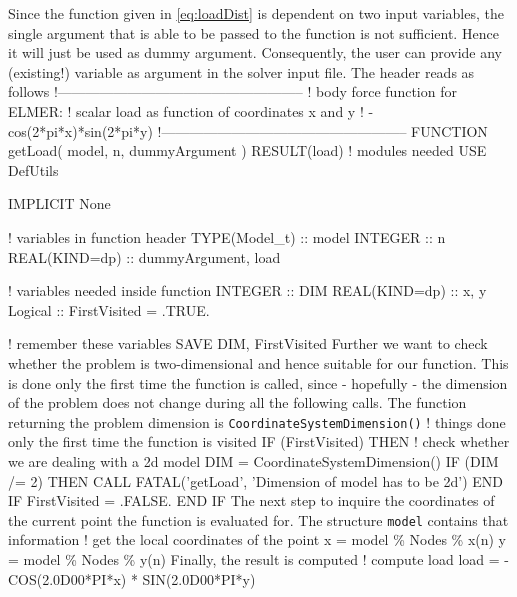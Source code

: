 Since the function given in \eqref{eq:loadDist} is dependent on two input variables, the single argument that is able to be passed to the function is not sufficient. Hence it will just be used as dummy argument. Consequently, the user can provide any (existing!) variable as argument in the solver input file. The header reads as follows
\ttbegin
!-----------------------------------------------------
! body force function for ELMER:
!   scalar load as function of coordinates x and y
!                -cos(2*pi*x)*sin(2*pi*y)  
!-----------------------------------------------------
FUNCTION getLoad( model, n, dummyArgument ) RESULT(load)
  ! modules needed
  USE DefUtils

  IMPLICIT None

  ! variables in function header
  TYPE(Model_t) :: model
  INTEGER :: n
  REAL(KIND=dp) :: dummyArgument, load

  ! variables needed inside function
  INTEGER :: DIM
  REAL(KIND=dp) :: x, y
  Logical :: FirstVisited = .TRUE.

  ! remember these variables    
  SAVE DIM, FirstVisited
\ttend
Further we want to check whether the problem is two-dimensional and hence suitable for our function. This is done only the first time the function is called, since - hopefully - the dimension of the problem does not change during all the following calls. The function returning the problem dimension is \texttt{CoordinateSystemDimension()}
\ttbegin
  ! things done only the first time the function is visited
  IF (FirstVisited) THEN
     ! check whether we are dealing with a 2d model
     DIM = CoordinateSystemDimension()
     IF (DIM /= 2) THEN
        CALL FATAL('getLoad', 'Dimension of model has to be 2d')
     END IF
     FirstVisited = .FALSE.
  END IF
\ttend
The next step to inquire the coordinates of the current point the function is evaluated for. The structure \texttt{model} contains that information
\ttbegin
  ! get the local coordinates of the point
  x = model \% Nodes \% x(n)
  y = model \% Nodes \% y(n)
\ttend
Finally, the result is computed
\ttbegin
  ! compute load 
  load = -COS(2.0D00*PI*x) * SIN(2.0D00*PI*y)


